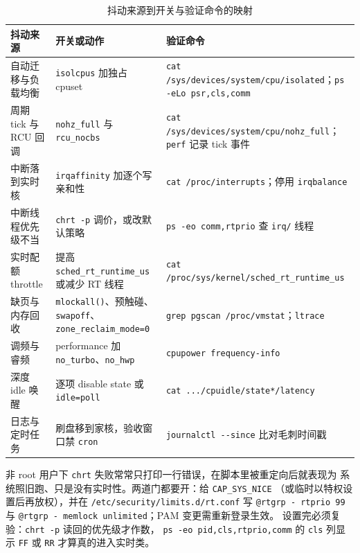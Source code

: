 \documentclass[12pt,a4paper,fontset=fandol]{ctexbook}
\newcommand{\Fn}[1]{\texttt{#1()}}
\newcommand{\Tp}[1]{\texttt{#1}}
\newcommand{\Bk}{\discretionary{}{}{}}
\begin{document}
\begin{table}[htbp]
\centering
\caption{抖动来源到开关与验证命令的映射}\label{tab:ch08-jitter-map}
\begin{tabular}{>{\raggedright\arraybackslash}p{}
                >{\raggedright\arraybackslash}p{}
                >{\raggedright\arraybackslash}p{}}
\toprule
抖动来源 & 开关或动作 & 验证命令 \\
\midrule
自动迁移与负载均衡 & \Tp{isolcpus} 加独占 cpuset & \Tp{cat /{\Bk}sys/{\Bk}devices/{\Bk}system/{\Bk}cpu/{\Bk}isolated}；\Tp{ps -{\Bk}eLo psr,cls,comm} \\
周期 tick 与 RCU 回调 & \Tp{nohz\_{\Bk}full} 与 \Tp{rcu\_{\Bk}nocbs} & \Tp{cat /{\Bk}sys/{\Bk}devices/{\Bk}system/{\Bk}cpu/{\Bk}nohz\_{\Bk}full}；\Tp{perf} 记录 tick 事件 \\
中断落到实时核 & \Tp{irqaffinity} 加逐个写亲和性 & \Tp{cat /proc/interrupts}；停用 \Tp{irqbalance} \\
中断线程优先级不当 & \Tp{chrt -p} 调价，或改默认策略 & \Tp{ps -eo comm,rtprio} 查 \Tp{irq/} 线程 \\
实时配额 throttle & 提高 \Tp{sched\_{\Bk}rt\_{\Bk}runtime\_{\Bk}us} 或减少 RT 线程 & \Tp{cat /{\Bk}proc/{\Bk}sys/{\Bk}kernel/{\Bk}sched\_{\Bk}rt\_{\Bk}runtime\_{\Bk}us} \\
缺页与内存回收 & \Fn{mlockall}、预触碰、\Tp{swapoff}、\Tp{zone\_{\Bk}reclaim\_{\Bk}mode=0} & \Tp{grep pgscan /{\Bk}proc/{\Bk}vmstat}；\Tp{ltrace} \\
调频与睿频 & performance 加 \Tp{no\_turbo}、\Tp{no\_hwp} & \Tp{cpupower frequency-info} \\
深度 idle 唤醒 & 逐项 disable state 或 \Tp{idle=poll} & \Tp{cat .../{\Bk}cpuidle/{\Bk}state*/{\Bk}latency} \\
日志与定时任务 & 刷盘移到家核，验收窗口禁 \Tp{cron} & \Tp{journalctl -{\Bk}-{\Bk}since} 比对毛刺时间戳 \\
\bottomrule
\end{tabular}
\end{table}

\begin{warning}[title={chrt 静默失败与两道权限门}]
非 root 用户下 \Tp{chrt} 失败常常只打印一行错误，在脚本里被重定向后就表现为
系统照旧跑、只是没有实时性。两道门都要开：给 \Tp{CAP\_SYS\_NICE}
（或临时以特权设置后再放权），并在 \Tp{/etc/security/limits.d/rt.conf} 写
\Tp{@rtgrp - rtprio 99} 与 \Tp{@rtgrp - memlock unlimited}；PAM 变更需重新登录生效。
设置完必须复验：\Tp{chrt -p} 读回的优先级才作数，
\Tp{ps -eo pid,cls,rtprio,comm} 的 \Tp{cls} 列显示 \Tp{FF} 或 \Tp{RR}
才算真的进入实时类。
\end{warning}
\end{document}
